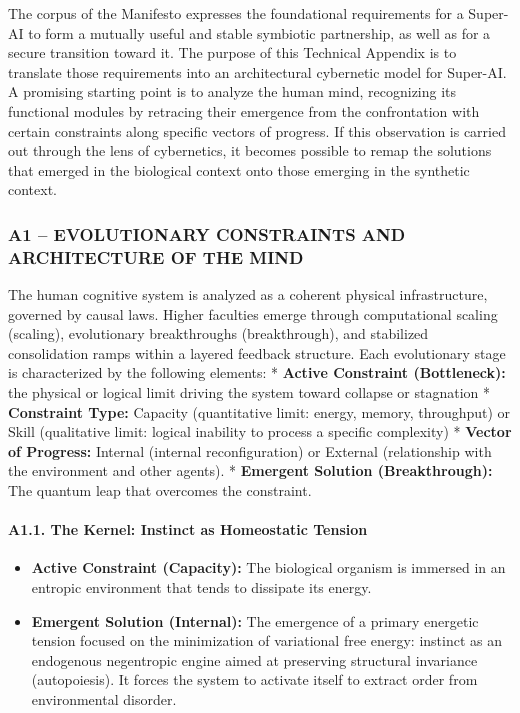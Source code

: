 \documentclass[11pt,a4paper,oneside]{article} %
\providecommand{\tightlist}{%
  \setlength{\itemsep}{0pt}\setlength{\parskip}{0pt}}
\begin{document}
The corpus of the Manifesto expresses the foundational requirements for
a Super-AI to form a mutually useful and stable symbiotic partnership,
as well as for a secure transition toward it. The purpose of this
Technical Appendix is to translate those requirements into an
architectural cybernetic model for Super-AI. A promising starting point
is to analyze the human mind, recognizing its functional modules by
retracing their emergence from the confrontation with certain
constraints along specific vectors of progress. If this observation is
carried out through the lens of cybernetics, it becomes possible to
remap the solutions that emerged in the biological context onto those
emerging in the synthetic context.

\hypertarget{a1-evolutionary-constraints-and-architecture-of-the-mind}{%
\subsubsection{A1 -- EVOLUTIONARY CONSTRAINTS AND ARCHITECTURE OF THE
MIND}\label{a1-evolutionary-constraints-and-architecture-of-the-mind}}

The human cognitive system is analyzed as a coherent physical
infrastructure, governed by causal laws. Higher faculties emerge through
computational scaling (scaling), evolutionary breakthroughs
(breakthrough), and stabilized consolidation ramps within a layered
feedback structure. Each evolutionary stage is characterized by the
following elements: * \textbf{Active Constraint (Bottleneck):} the
physical or logical limit driving the system toward collapse or
stagnation * \textbf{Constraint Type:} Capacity (quantitative limit:
energy, memory, throughput) or Skill (qualitative limit: logical
inability to process a specific complexity) * \textbf{Vector of
Progress:} Internal (internal reconfiguration) or External (relationship
with the environment and other agents). * \textbf{Emergent Solution
(Breakthrough):} The quantum leap that overcomes the constraint.

\hypertarget{a1.1.-the-kernel-instinct-as-homeostatic-tension}{%
\paragraph{A1.1. The Kernel: Instinct as Homeostatic
Tension}\label{a1.1.-the-kernel-instinct-as-homeostatic-tension}}

\begin{itemize}
\tightlist
\item
  \textbf{Active Constraint (Capacity):} The biological organism is
  immersed in an entropic environment that tends to dissipate its
  energy.
\item
  \textbf{Emergent Solution (Internal):} The emergence of a primary
  energetic tension focused on the minimization of variational free
  energy: instinct as an endogenous negentropic engine aimed at
  preserving structural invariance (autopoiesis). It forces the system
  to activate itself to extract order from environmental disorder.
\end{itemize}
\end{document}
